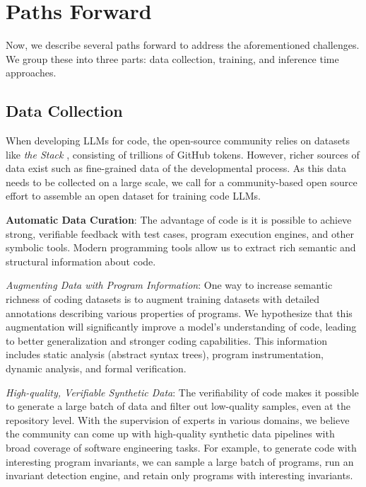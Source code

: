 \section{Paths Forward} \label{sec:main-paths}

Now, we describe several paths forward to address the aforementioned challenges. We group these into three parts: data collection, training, and inference time approaches. 

\subsection{Data Collection} 

When developing LLMs for code, the open-source community relies on datasets like \textit{the Stack} \citep{lozhkov2024starcoder}, consisting of trillions of GitHub tokens. However, richer sources of data exist such as fine-grained data of the developmental process. As this data needs to be collected on a large scale, we call for a community-based open source effort to assemble an open dataset for training code LLMs.

\textbf{Automatic Data Curation}: The advantage of code is it is possible to achieve strong, verifiable feedback with test cases, program execution engines, and other symbolic tools. Modern programming tools allow us to extract rich semantic and structural information about code. 

\textit{Augmenting Data with Program Information}: One way to increase semantic richness of coding datasets is to augment training datasets with detailed annotations describing various properties of programs. We hypothesize that this augmentation will significantly improve a model’s understanding of code, leading to better generalization and stronger coding capabilities. This information includes static analysis (abstract syntax trees), program instrumentation, dynamic analysis, and formal verification. 

\textit{High-quality, Verifiable Synthetic Data}: The verifiability of code makes it possible to generate a large batch of data and filter out low-quality samples, even at the repository level. With the supervision of experts in various domains, we believe the community can come up with high-quality synthetic data pipelines with broad coverage of software engineering tasks. For example, to generate code with interesting program invariants, we can sample a large batch of programs, run an invariant detection engine, and retain only programs with interesting invariants.

